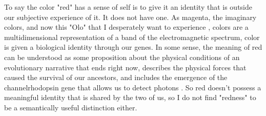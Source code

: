 \documentclass[runningheads]{llncs}
\begin{document}
To say the color "red" has a sense of self is to give it an identity that is outside our subjective experience of it. It does not have one. As magenta, the imaginary colors, and now this "Olo" that I desperately want to experience \cite{Gibney2025}, colors are a multidimensional representation of a band of the electromagnetic spectrum, color is given a biological identity through our genes. In some sense, the meaning of red can be understood as some proposition about the physical conditions of an evolutionary narrative that ends right now, describes the physical forces that caused the survival of our ancestors, and includes the emergence of the channelrhodopsin gene that allows us to detect photons \cite{Rozenberg2012}. So red doesn't possess a meaningful identity that is shared by the two of us, so I do not find "redness" to be a semantically useful distinction either.  
\end{document}
